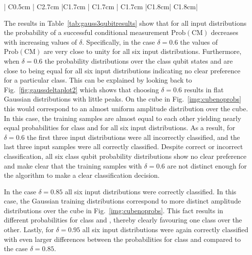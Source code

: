\begin{table}[H]
\begin{tabular}{| C{0.5cm} | C{2.7cm} |C{1.7cm} | C{1.7cm} | C{1.7cm} |C{1.8cm}| C{1.8cm}|}
      \bottomrule
    \end{tabular}
    \caption{\label{tab:gauss3qubitresults} Amplitude-based kNN algorithm classification results after 1000 runs for various Gaussian distributions centered around six different three-qubit patterns. The Gaussian distributions were created using the coin gate $C(\delta)$. For each pattern three different distributions were prepared and classified by changing the parameter $\delta$: The results for $\delta = 0.6$ are always on top and marked with an empty circle ($\circ$), results for $\delta = 0.85$ are always in the middle marked with a filled circle ($\bullet$) and results for $\delta = 0.95$ are always at the bottom and marked with a triangle ($\triangleright$)}
\end{table}

The results in Table~\ref{tab:gauss3qubitresults} show that for all input distributions the probability of a successful conditional measurement $\mathrm{Prob}(\mathrm{CM})$ decreases with increasing values of $\delta$. Specifically, in the case $\delta = 0.6$ the values of $\mathrm{Prob}(\mathrm{CM})$ are very close to unity for all six input distributions. Furthermore, when $\delta = 0.6$ the probability distributions over the class qubit states \0 and \1 are close to being equal for all six input distributions indicating no clear preference for a particular class. This can be explained by looking back to Fig.~\ref{fig:gaussdeltaplot2} which shows that choosing $\delta = 0.6$ results in flat Gaussian distributions with little peaks. On the cube in Fig.~\ref{img:cubenoprobs} this would correspond to an almost uniform amplitude distribution over the cube. In this case, the training samples are almost equal to each other yielding nearly equal probabilities for class \0 and \1 for all six input distributions. As a result, for $\delta = 0.6$ the first three input distributions were all incorrectly classified, and the last three input samples were all correctly classified. Despite correct or incorrect classification, all six class qubit probability distributions show no clear preference and make clear that the training samples with $\delta = 0.6$ are not distinct enough for the algorithm to make a clear classification decision.

In the case $\delta = 0.85$ all six input distributions were correctly classified. In this case, the Gaussian training distributions correspond to more distinct amplitude distributions over the cube in Fig.~\ref{img:cubenoprobs}. This fact results in different probabilities for class \0 and \1, thereby clearly favouring one class over the other. Lastly, for $\delta = 0.95$ all six input distributions were again correctly classified with even larger differences between the probabilities for class \0 and \1 compared to the case $\delta = 0.85$.

